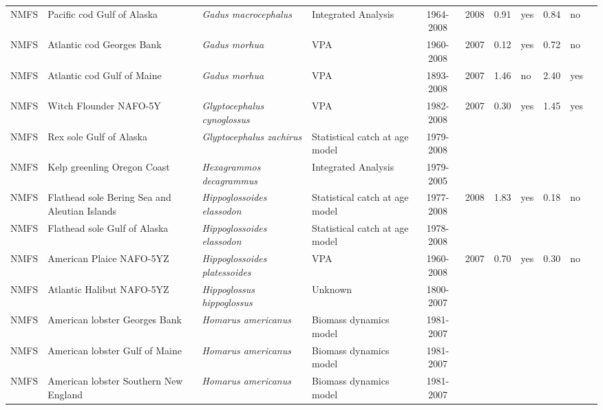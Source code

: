 \begin{longtable}{p{1.8cm}p{3.5cm}p{3.5cm}p{3cm}cccp{0.9cm}cp{0.9cm}c}
  NMFS & Pacific cod Gulf of Alaska & \textit{Gadus macrocephalus} & Integrated Analysis & 1964-2008 & 2008 & 0.91 & yes & 0.84 & no & \cite{AFSC-PCODGA-2008-Pacific-cod-GA.pdf} \\ 
  NMFS & Atlantic cod Georges Bank & \textit{Gadus morhua} & VPA & 1960-2008 & 2007 & 0.12 & yes & 0.72 & no & \cite{NMFS-GB-Gadusmorhua-2008.pdf} \\ 
  NMFS & Atlantic cod Gulf of Maine & \textit{Gadus morhua} & VPA & 1893-2008 & 2007 & 1.46 & no & 2.40 & yes & \cite{NMFS-GOM-Gadusmorhua-2008.pdf} \\ 
  NMFS & Witch Flounder NAFO-5Y & \textit{Glyptocephalus cynoglossus} & VPA & 1982-2008 & 2007 & 0.30 & yes & 1.45 & yes & \cite{crd0815.pdf} \\ 
  NMFS & Rex sole Gulf of Alaska & \textit{Glyptocephalus zachirus} & Statistical catch at age model & 1979-2008 &  &  &  &  &  & \cite{ref2008-SAFE-GOArex.pdf} \\ 
  NMFS & Kelp greenling Oregon Coast & \textit{Hexagrammos decagrammus} & Integrated Analysis & 1979-2005 &  &  &  &  &  & \cite{KelpGreenling_2005.pdf} \\ 
  NMFS & Flathead sole Bering Sea and Aleutian Islands & \textit{Hippoglossoides elassodon} & Statistical catch at age model & 1977-2008 & 2008 & 1.83 & yes & 0.18 & no & \cite{2008_SAFE_BSAIflathead.pdf} \\ 
  NMFS & Flathead sole Gulf of Alaska & \textit{Hippoglossoides elassodon} & Statistical catch at age model & 1978-2008 &  &  &  &  &  & \cite{2008_SAFE_GOAflathead.pdf} \\ 
  NMFS & American Plaice NAFO-5YZ & \textit{Hippoglossoides platessoides} & VPA & 1960-2008 & 2007 & 0.70 & yes & 0.30 & no & \cite{ .pdf} \\ 
  NMFS & Atlantic Halibut NAFO-5YZ & \textit{Hippoglossus hippoglossus} & Unknown & 1800-2007 &  &  &  &  &  & \cite{AtlanticHalibut5YZ2008.pdf .pdf} \\ 
  NMFS & American lobster Georges Bank & \textit{Homarus americanus} & Biomass dynamics model & 1981-2007 &  &  &  &  &  & \cite{2009-ASMFC-Am-Lob.pdf} \\ 
  NMFS & American lobster Gulf of Maine & \textit{Homarus americanus} & Biomass dynamics model & 1981-2007 &  &  &  &  &  & \cite{2009-ASMFC-Am-Lob.pdf} \\ 
  NMFS & American lobster Southern New England & \textit{Homarus americanus} & Biomass dynamics model & 1981-2007 &  &  &  &  &  & \cite{2009-ASMFC-Am-Lob.pdf} \\ 

\end{longtable}
